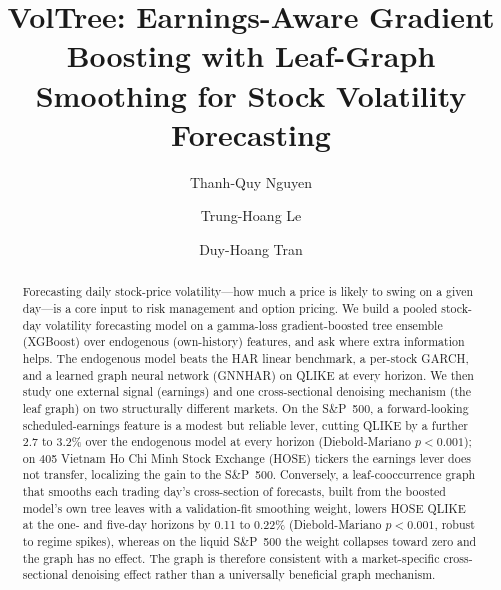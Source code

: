 \documentclass[runningheads]{llncs}
\begin{document}
\title{VolTree: Earnings-Aware Gradient Boosting with Leaf-Graph Smoothing for Stock Volatility Forecasting}

\author{Thanh-Quy Nguyen \and Trung-Hoang Le \and Duy-Hoang Tran}

\maketitle
\pagestyle{empty}\thispagestyle{empty}   %

\begin{abstract}
Forecasting daily stock-price volatility---how much a price is likely to swing on a given day---is a core
input to risk management and option pricing. We build a pooled stock-day volatility forecasting model on a
gamma-loss gradient-boosted tree ensemble (XGBoost) over endogenous (own-history) features, and ask where
extra information helps. The endogenous model beats the HAR linear benchmark, a per-stock GARCH, and a
learned graph neural network (GNNHAR) on QLIKE at every horizon. We then study one external signal
(earnings) and one cross-sectional denoising mechanism (the leaf graph) on two structurally different
markets. On the S\&P~500, a forward-looking scheduled-earnings feature is a modest but reliable lever,
cutting QLIKE by a further 2.7 to 3.2\% over the endogenous model at every horizon (Diebold-Mariano
$p<0.001$); on 405 Vietnam Ho Chi Minh Stock Exchange (HOSE) tickers the earnings lever does not transfer,
localizing the gain to the S\&P~500. Conversely, a leaf-cooccurrence graph that smooths each trading day's
cross-section of forecasts, built from the boosted model's own tree leaves with a validation-fit smoothing
weight, lowers HOSE QLIKE at the one- and five-day horizons by 0.11 to 0.22\% (Diebold-Mariano $p<0.001$,
robust to regime spikes), whereas on the liquid S\&P~500 the weight collapses toward zero and the graph has
no effect. The graph is therefore consistent with a market-specific cross-sectional denoising effect
rather than a universally beneficial graph mechanism.
\end{abstract}
\end{document}
